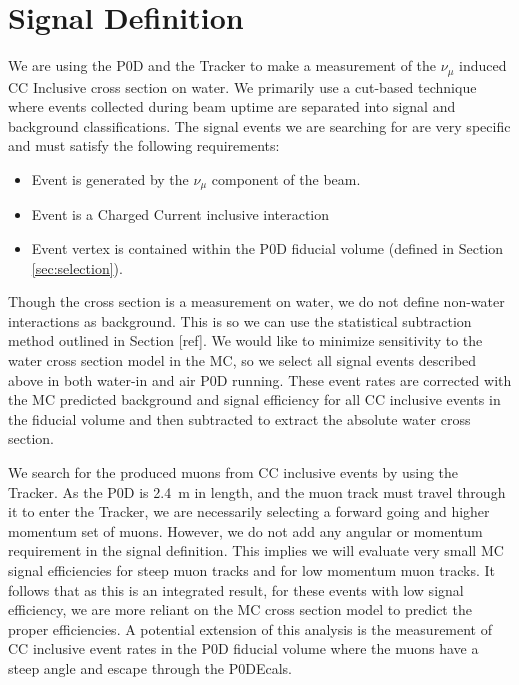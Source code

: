 \section{Signal Definition}
\label{sec:SignalDefinition}

We are using the P0D and the Tracker to make a measurement of the $\nu_\mu$ induced CC Inclusive cross section on water. We primarily use a cut-based technique where events collected during beam uptime are separated into signal and background classifications. The signal events we are searching for are very specific and must satisfy the following requirements:

\begin{itemize}
\item Event is generated by the $\nu_\mu$ component of the beam.
\item Event is a Charged Current inclusive interaction
\item Event vertex is contained within the P0D fiducial volume (defined in Section \ref{sec:selection}).
\end{itemize}

Though the cross section is a measurement on water, we do not define non-water interactions as background. This is so we can use the statistical subtraction method outlined in Section [ref]. We would like to minimize sensitivity to the water cross section model in the MC, so we select all signal events described above in both water-in and air P0D running. These event rates are corrected with the MC predicted background and signal efficiency for all CC inclusive events in the fiducial volume and then subtracted to extract the absolute water cross section.

We search for the produced muons from CC inclusive events by using the Tracker. As the P0D is 2.4~m in length, and the muon track must travel through it to enter the Tracker, we are necessarily selecting a forward going and higher momentum set of muons. However, we do not add any angular or momentum requirement in the signal definition. This implies we will evaluate very small MC signal efficiencies for steep muon tracks and for low momentum muon tracks. It follows that as this is an integrated result, for these events with low signal efficiency, we are more reliant on the MC cross section model to predict the proper efficiencies. A potential extension of this analysis is the measurement of CC inclusive event rates in the P0D fiducial volume where the muons have a steep angle and escape through the P0DEcals. 